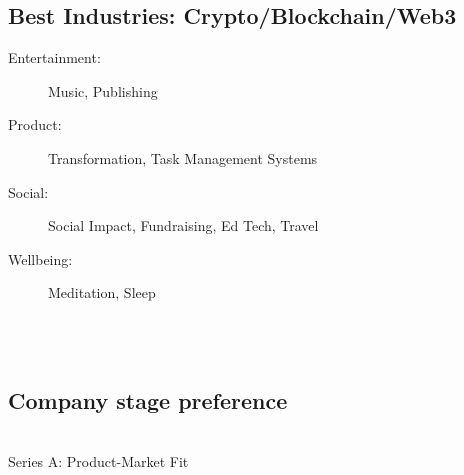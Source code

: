 {{\subsection*{%
Best Industries:
Crypto/Blockchain/Web3
}
\begin{description}
\item[Entertainment:] Music, Publishing %
\item[Product:]
Transformation,
Task Management Systems
\item[Social:] Social Impact, Fundraising, Ed Tech, Travel %
\item[Wellbeing:] Meditation, Sleep %
\end{description}
\\ \\
\subsection*{Company stage preference}     \\
Series A:
Product-Market Fit






    }%
}
